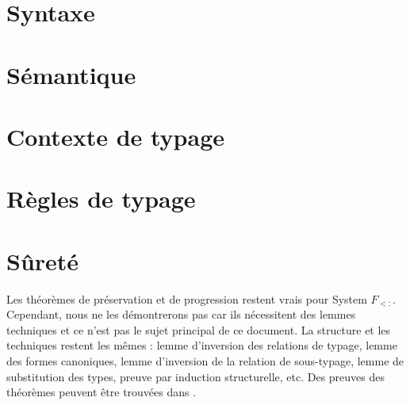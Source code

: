 \section{Syntaxe}


\section{Sémantique}

\section{Contexte de typage}

\section{Règles de typage}

\section{Sûreté}

Les théorèmes de préservation et de progression restent vrais pour System
$F_{<:}$. Cependant, nous ne les démontrerons pas car ils nécessitent des lemmes
techniques et ce n'est pas le sujet principal de ce document. La structure
et les techniques restent les mêmes : lemme d'inversion des relations de typage,
lemme des formes canoniques, lemme d'inversion de la relation de sous-typage, lemme de
substitution des types, preuve par induction structurelle, etc.
Des preuves des théorèmes peuvent être trouvées dans
\cite{tapl-bounded-quantification}.